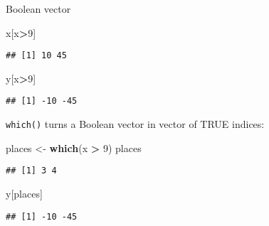 \documentclass[8pt,ignorenonframetext,]{beamer}
\newenvironment{Shaded}{\begin{snugshade}}{\end{snugshade}}
\newcommand{\KeywordTok}[1]{\textcolor[rgb]{0.13,0.29,0.53}{\textbf{#1}}}
\newcommand{\DecValTok}[1]{\textcolor[rgb]{0.00,0.00,0.81}{#1}}
\newcommand{\StringTok}[1]{\textcolor[rgb]{0.31,0.60,0.02}{#1}}
\newcommand{\OperatorTok}[1]{\textcolor[rgb]{0.81,0.36,0.00}{\textbf{#1}}}
\newcommand{\NormalTok}[1]{#1}
\begin{document}
\begin{frame}[fragile]{Boolean vector}

\begin{Shaded}
\begin{Highlighting}[]
\NormalTok{x[x}\OperatorTok{>}\DecValTok{9}\NormalTok{]}
\end{Highlighting}
\end{Shaded}

\begin{verbatim}
## [1] 10 45
\end{verbatim}

\begin{Shaded}
\begin{Highlighting}[]
\NormalTok{y[x}\OperatorTok{>}\DecValTok{9}\NormalTok{]}
\end{Highlighting}
\end{Shaded}

\begin{verbatim}
## [1] -10 -45
\end{verbatim}

\texttt{which()} turns a Boolean vector in vector of TRUE indices:

\begin{Shaded}
\begin{Highlighting}[]
\NormalTok{places <-}\StringTok{ }\KeywordTok{which}\NormalTok{(x }\OperatorTok{>}\StringTok{ }\DecValTok{9}\NormalTok{)}
\NormalTok{places}
\end{Highlighting}
\end{Shaded}

\begin{verbatim}
## [1] 3 4
\end{verbatim}

\begin{Shaded}
\begin{Highlighting}[]
\NormalTok{y[places]}
\end{Highlighting}
\end{Shaded}

\begin{verbatim}
## [1] -10 -45
\end{verbatim}

\end{frame}
\end{document}
